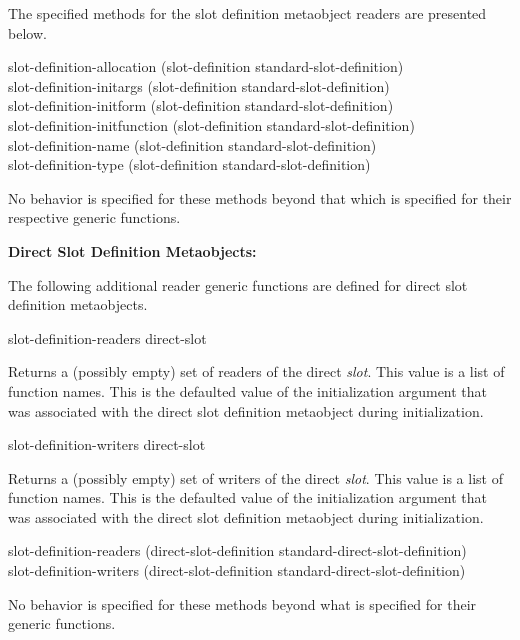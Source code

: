 The specified methods for the slot definition metaobject readers are presented below.

\begin{defun}
slot-definition-allocation (slot-definition standard-slot-definition) \\
slot-definition-initargs (slot-definition standard-slot-definition) \\
slot-definition-initform (slot-definition standard-slot-definition) \\
slot-definition-initfunction (slot-definition standard-slot-definition) \\
slot-definition-name (slot-definition standard-slot-definition) \\
slot-definition-type (slot-definition standard-slot-definition)

No behavior is specified for these methods beyond that which is specified for
their respective generic functions.
\end{defun}

\textbf{Direct Slot Definition Metaobjects:}

The following additional reader generic functions are defined for direct slot
definition metaobjects.

\begin{defun}
slot-definition-readers direct-slot

Returns a (possibly empty) set of readers of the direct \emph{slot}. This value
is a list of function names. This is the defaulted value of the 
initialization argument that was associated with the direct slot definition
metaobject during initialization.
\end{defun}

\begin{defun}
slot-definition-writers direct-slot

Returns a (possibly empty) set of writers of the direct \emph{slot}. This value
is a list of function names. This is the defaulted value of the 
initialization argument that was associated with the direct slot definition
metaobject during initialization.
\end{defun}

\begin{defun}
slot-definition-readers (direct-slot-definition standard-direct-slot-definition) \\
slot-definition-writers (direct-slot-definition standard-direct-slot-definition)

No behavior is specified for these methods beyond what is specified for their
generic functions.
\end{defun}


